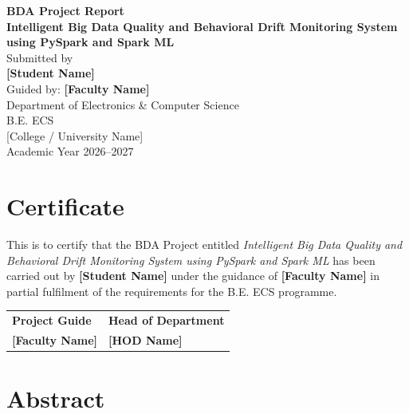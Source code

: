 \documentclass[12pt,a4paper]{report}
\begin{document}

\begin{titlepage}
\centering
\vspace*{1.2cm}
{\Large\textbf{BDA Project Report}}\\[1.2cm]
{\LARGE\textbf{Intelligent Big Data Quality and Behavioral Drift Monitoring System using PySpark and Spark ML}}\\[1.5cm]
{\large Submitted by}\\[0.4cm]
{\large\textbf{[Student Name]}}\\[0.8cm]
{\large Guided by: \textbf{[Faculty Name]}}\\[1.2cm]
{\large Department of Electronics \& Computer Science}\\
{\large B.E. ECS}\\[1.2cm]
{\large [College / University Name]}\\[1.2cm]
{\large Academic Year 2026--2027}
\vfill
\end{titlepage}

\chapter*{Certificate}
This is to certify that the BDA Project entitled \textit{Intelligent Big Data Quality and Behavioral Drift Monitoring System using PySpark and Spark ML} has been carried out by \textbf{[Student Name]} under the guidance of \textbf{[Faculty Name]} in partial fulfilment of the requirements for the B.E. ECS programme.

\vspace{2cm}
\begin{tabular}{p{6cm}p{6cm}}
\textbf{Project Guide} & \textbf{Head of Department}\\[1.5cm]
\textbf{[Faculty Name]} & \textbf{[HOD Name]}\\
\end{tabular}

\clearpage






\chapter*{Abstract}
\end{document}
